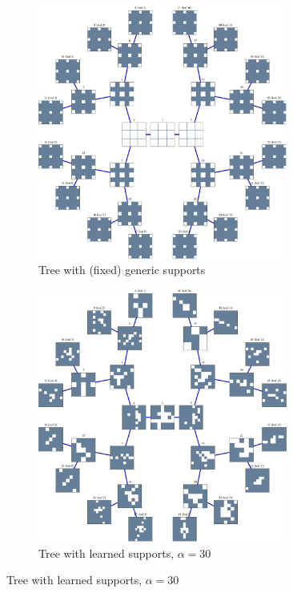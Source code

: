 \begin{figure}[!ht] \centering
\begin{subfigure}[b]{0.49\textwidth}\centering
\includegraphics[width=0.9\textwidth]{figures/tree-learn-setup/xp_learnsupp256_curvelet_decomp3[tree-binary_dpth4]_supp-generic3x3_[fixed-supports]_tree.pdf}
	\caption{Tree with (fixed) generic supports}
\end{subfigure}
\begin{subfigure}[b]{0.49\textwidth}\centering
\includegraphics[width=0.9\textwidth]{figures/tree-gradient-vs-sequential/xp_learnsupp256_curvelet_decomp3_tree-binary_dpth4_supp-diracs_usegrad1_every5_add5_totinit0_totadd279_alpha30_tree.pdf} 
	\caption{Tree with learned supports, $\alpha=30$}
\end{subfigure}
\end{figure}
